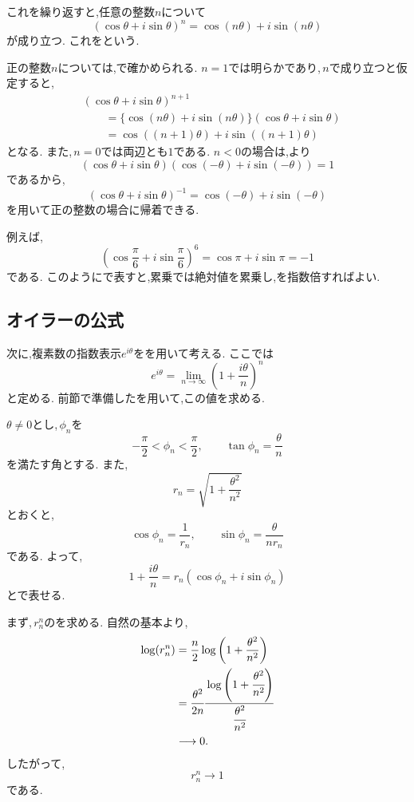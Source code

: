     これを繰り返すと,任意の整数$n$について
    \[
      (\cos\theta+i\sin\theta)^n
      =
      \cos(n\theta)+i\sin(n\theta)
    \]
    が成り立つ.
    これをという.

    正の整数$n$については,で確かめられる.
    $n=1$では明らかであり,\,$n$で成り立つと仮定すると,
    \begin{align*}
      &(\cos\theta+i\sin\theta)^{n+1}\\
        &\qquad =\{\cos(n\theta)+i\sin(n\theta)\}
        (\cos\theta+i\sin\theta)\\
        &\qquad =\cos((n+1)\theta)+i\sin((n+1)\theta)
    \end{align*}
    となる.
    また,\,$n=0$では両辺とも$1$である.
    $n<0$の場合は,より
    \[
      (\cos\theta+i\sin\theta)
      (\cos(-\theta)+i\sin(-\theta))=1
    \]
    であるから,
    \[
      (\cos\theta+i\sin\theta)^{-1}
      =
      \cos(-\theta)+i\sin(-\theta)
    \]
    を用いて正の整数の場合に帰着できる.

    例えば,
    \[
      \left(
        \cos\frac{\pi}{6}
        +i\sin\frac{\pi}{6}
      \right)^6
      =
      \cos\pi+i\sin\pi
      =
      -1
    \]
    である.
    このようにで表すと,累乗では絶対値を累乗し,を指数倍すればよい.

  \subsection{オイラーの公式}\label{節：オイラーの公式}
    次に,複素数の指数表示$e^{i\theta}$をを用いて考える.
    ここでは
    \[
      e^{i\theta}
      =
      \lim_{n\to\infty}
      \left(1+\frac{i\theta}{n}\right)^n
    \]
    と定める.
    前節で準備したを用いて,この値を求める.

    $\theta\ne0$とし,\,$\phi_n$を
    \[
      -\frac{\pi}{2}<\phi_n<\frac{\pi}{2},
      \qquad
      \tan\phi_n=\frac{\theta}{n}
    \]
    を満たす角とする.
    また,
    \[
      r_n=\sqrt{1+\frac{\theta^2}{n^2}}
    \]
    とおくと,
    \[
      \cos\phi_n=\frac{1}{r_n},
      \qquad
      \sin\phi_n=\frac{\theta}{nr_n}
    \]
    である.
    よって,
    \[
      1+\frac{i\theta}{n}
      =
      r_n(\cos\phi_n+i\sin\phi_n)
    \]
    とで表せる.

    まず,\,$r_n^n$のを求める.
    自然の基本より,
    \begin{align*}
      \log(r_n^n)
        &=
        \frac{n}{2}
        \log\left(1+\frac{\theta^2}{n^2}\right)\\
        &=
        \cfrac{\theta^2}{2n}
        \cfrac{
          \log\left(1+\cfrac{\theta^2}{n^2}\right)
        }{
          \cfrac{\theta^2}{n^2}
        }\\
        &\longrightarrow0.
    \end{align*}
    したがって,
    \[
      r_n^n\longrightarrow1
    \]
    である.

